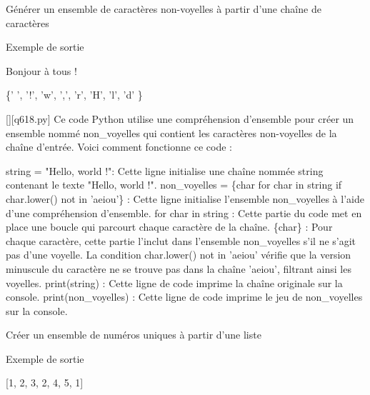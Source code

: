         \question
        Générer un ensemble de caractères non-voyelles à partir d'une chaîne de caractères

Exemple de sortie

Bonjour à tous !

\{' ', '!', 'w', ',', 'r', 'H', 'l', 'd' \}
        \par
        \begin{solution}
            \renewcommand{\nomfichier}{q618.py}
            \pythonfile{\chemincode \nomfichier}[][\nomfichier]
            Ce code Python utilise une compréhension d'ensemble pour créer un ensemble nommé non\_voyelles qui contient les caractères non-voyelles de la chaîne d'entrée. Voici comment fonctionne ce code :

    string = "Hello, world !": Cette ligne initialise une chaîne nommée string contenant le texte "Hello, world !".
    non\_voyelles = \{char for char in string if char.lower() not in 'aeiou'\} : Cette ligne initialise l'ensemble non\_voyelles à l'aide d'une compréhension d'ensemble.
        for char in string : Cette partie du code met en place une boucle qui parcourt chaque caractère de la chaîne.
        \{char\} : Pour chaque caractère, cette partie l'inclut dans l'ensemble non\_voyelles s'il ne s'agit pas d'une voyelle. La condition char.lower() not in 'aeiou' vérifie que la version minuscule du caractère ne se trouve pas dans la chaîne 'aeiou', filtrant ainsi les voyelles.
    print(string) : Cette ligne de code imprime la chaîne originale sur la console.
    print(non\_voyelles) : Cette ligne de code imprime le jeu de non\_voyelles sur la console.
        \end{solution}
        

        \question
        Créer un ensemble de numéros uniques à partir d'une liste

Exemple de sortie

[1, 2, 3, 2, 4, 5, 1]

